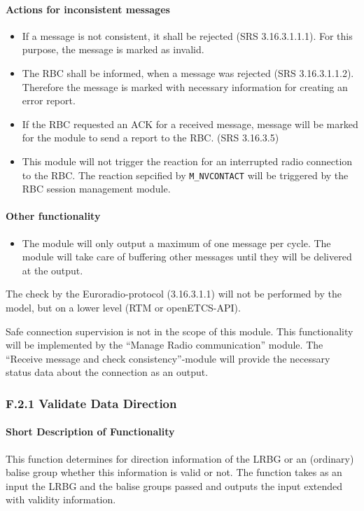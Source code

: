 \documentclass{template/openetcs_report}
\begin{document}
\paragraph{Actions for inconsistent messages}
\begin{itemize}
  \item If a message is not consistent, it shall be rejected (SRS 3.16.3.1.1.1). For this purpose, the message is marked as invalid.
  \item The RBC shall be informed, when a message was rejected (SRS 3.16.3.1.1.2). Therefore the message is marked with necessary information for creating an error report. 
  \item If the RBC requested an ACK for a received message, message will be marked for the module to send a report to the RBC. (SRS 3.16.3.5)
  \item This module will not trigger the reaction for an interrupted radio connection to the RBC. The reaction sepcified by \texttt{M\_NVCONTACT} will be triggered by the RBC session management module.
\end{itemize}

\paragraph{Other functionality}
\begin{itemize}
 \item The module will only output a maximum of one message per cycle. The module will take care of buffering other messages until they will be delivered at the output.
\end{itemize}


The check by the Euroradio-protocol (3.16.3.1.1) will not be performed by the model, but on a lower level (RTM or openETCS-API).

Safe connection supervision is not in the scope of this module. This functionality will be implemented by the ``Manage Radio communication'' module. The ``Receive message and check consistency''-module will provide the necessary status data about the connection as an output.

\subsubsection{F.2.1 Validate Data Direction}

\paragraph{Short Description of Functionality}
This function determines for direction information of the LRBG or an (ordinary) balise group whether this information is valid or not. The function takes as an input the LRBG and the balise groups passed and outputs the input extended with validity information.
\end{document}
